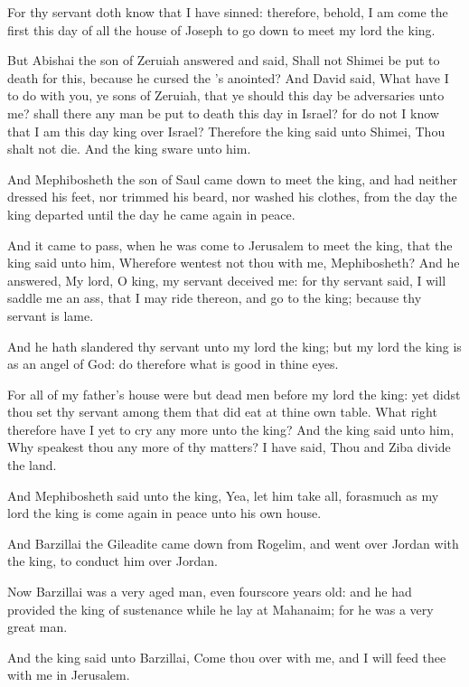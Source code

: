 \verse For thy servant doth know that I have sinned: therefore, behold, I am come the first this day of all the house of Joseph to go down to meet my lord the king.

\verse But Abishai the son of Zeruiah answered and said, Shall not Shimei be put to death for this, because he cursed the \LORD's anointed?  \verse And David said, What have I to do with you, ye sons of Zeruiah, that ye should this day be adversaries unto me? shall there any man be put to death this day in Israel? for do not I know that I am this day king over Israel?  \verse Therefore the king said unto Shimei, Thou shalt not die. And the king sware unto him.

\verse And Mephibosheth the son of Saul came down to meet the king, and had neither dressed his feet, nor trimmed his beard, nor washed his clothes, from the day the king departed until the day he came again in peace.

\verse And it came to pass, when he was come to Jerusalem to meet the king, that the king said unto him, Wherefore wentest not thou with me, Mephibosheth?  \verse And he answered, My lord, O king, my servant deceived me: for thy servant said, I will saddle me an ass, that I may ride thereon, and go to the king; because thy servant is lame.

\verse And he hath slandered thy servant unto my lord the king; but my lord the king is as an angel of God: do therefore what is good in thine eyes.

\verse For all of my father's house were but dead men before my lord the king: yet didst thou set thy servant among them that did eat at thine own table. What right therefore have I yet to cry any more unto the king?  \verse And the king said unto him, Why speakest thou any more of thy matters? I have said, Thou and Ziba divide the land.

\verse And Mephibosheth said unto the king, Yea, let him take all, forasmuch as my lord the king is come again in peace unto his own house.

\verse And Barzillai the Gileadite came down from Rogelim, and went over Jordan with the king, to conduct him over Jordan.

\verse Now Barzillai was a very aged man, even fourscore years old: and he had provided the king of sustenance while he lay at Mahanaim; for he was a very great man.

\verse And the king said unto Barzillai, Come thou over with me, and I will feed thee with me in Jerusalem.

